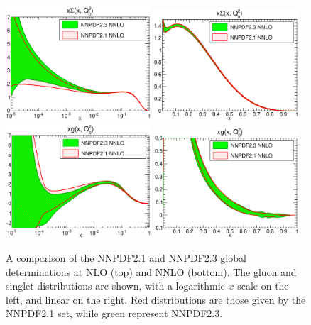 \begin{figure}[hp!]
\includegraphics[width=0.48\textwidth]{6-LHCimpact/figs/xSinglet_Q_2_log-21-vs-23.eps}
\includegraphics[width=0.48\textwidth]{6-LHCimpact/figs/xSinglet_Q_2_lin-21-vs-23.eps}\\
\includegraphics[width=0.48\textwidth]{6-LHCimpact/figs/xg_Q_2_log-21-vs-23.eps}
\includegraphics[width=0.48\textwidth]{6-LHCimpact/figs/xg_Q_2_lin-21-vs-23.eps}
\caption[A comparison of the NNPDF2.1 and NNPDF2.3 gluon and singlet global determinations at NLO and NNLO]{A comparison of the NNPDF2.1 and NNPDF2.3 global determinations at NLO (top) and NNLO (bottom). The gluon and singlet distributions are shown, with a logarithmic $x$ scale on the left, and linear on the right. Red distributions are those given by the NNPDF2.1 set, while green represent NNPDF2.3.}
\label{fig:23vs21}
\end{figure}


